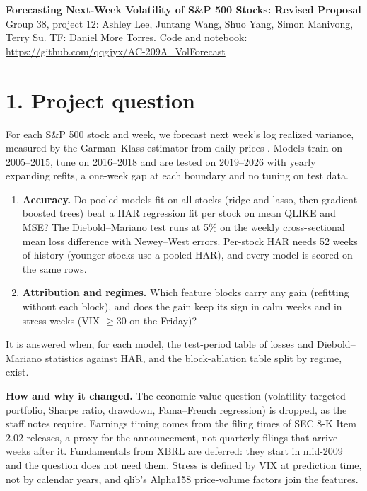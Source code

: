\documentclass[11pt]{article}
\begin{document}
{\large\textbf{Forecasting Next-Week Volatility of S\&P 500 Stocks: Revised Proposal}}\\[0.1em]
Group 38, project 12: Ashley Lee, Juntang Wang, Shuo Yang, Simon Manivong, Terry Su. TF: Daniel More Torres.
Code and notebook: \url{https://github.com/qqgjyx/AC-209A_VolForecast}

\section*{1. Project question}

For each S\&P 500 stock and week, we forecast next week's log realized variance, measured by the
Garman--Klass estimator from daily prices \citep{garman1980gk}. Models train on 2005--2015, tune on
2016--2018 and are tested on 2019--2026 with yearly expanding refits, a one-week gap at each
boundary and no tuning on test data.
\begin{enumerate}
  \item \textbf{Accuracy.} Do pooled models fit on all stocks (ridge and lasso, then gradient-boosted
        trees) beat a HAR regression fit per stock \citep{corsi2009har} on mean QLIKE
        \citep{patton2011qlike} and MSE? The Diebold--Mariano test \citep{diebold1995dm} runs at 5\% on the
        weekly cross-sectional mean loss difference with Newey--West errors. Per-stock HAR needs 52 weeks of
        history (younger stocks use a pooled HAR), and every model is scored on the same rows.
  \item \textbf{Attribution and regimes.} Which feature blocks carry any gain (refitting without each
        block), and does the gain keep its sign in calm weeks and in stress weeks (VIX $\ge 30$ on the Friday)?
\end{enumerate}
It is answered when, for each model, the test-period table of losses and Diebold--Mariano statistics
against HAR, and the block-ablation table split by regime, exist.

\textbf{How and why it changed.} The economic-value question (volatility-targeted portfolio, Sharpe
ratio, drawdown, Fama--French regression) is dropped, as the staff notes require. Earnings timing comes
from the filing times of SEC 8-K Item 2.02 releases, a proxy for the announcement, not quarterly
filings that arrive weeks after it. Fundamentals from XBRL are deferred: they start in mid-2009 and the question does not
need them. Stress is defined by VIX at prediction time, not by calendar years, and qlib's Alpha158
price-volume factors \citep{yang2020qlib} join the features.
\end{document}
